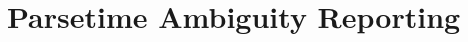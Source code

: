 \documentclass[acmsmall,review,anonymous]{acmart}\settopmatter{printfolios=true,printccs=false,printacmref=false}
\newcommand{\T}{\Sigma} %
\newcommand{\yield}{\mathit{yield}} %
\begin{document}
\clearpage


\section{Parsetime Ambiguity Reporting} \label{sec:parse-time-reporting}














\end{document}

